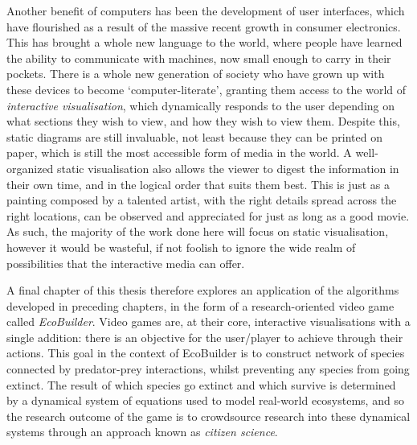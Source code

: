 Another benefit of computers has been the development of user interfaces, which have flourished as a result of the massive recent growth in consumer electronics. This has brought a whole new language to the world, where people have learned the ability to communicate with machines, now small enough to carry in their pockets. There is a whole new generation of society who have grown up with these devices to become `computer-literate', granting them access to the world of \emph{interactive visualisation}, which dynamically responds to the user depending on what sections they wish to view, and how they wish to view them.
Despite this, static diagrams are still invaluable, not least because they can be printed on paper, which is still the most accessible form of media in the world. A well-organized static visualisation also allows the viewer to digest the information in their own time, and in the logical order that suits them best. This is just as a painting composed by a talented artist, with the right details spread across the right locations, can be observed and appreciated for just as long as a good movie.
As such, the majority of the work done here will focus on static visualisation, however it would be wasteful, if not foolish to ignore the wide realm of possibilities that the interactive media can offer.

A final chapter of this thesis therefore explores an application of the algorithms developed in preceding chapters, in the form of a research-oriented video game called \emph{EcoBuilder}. Video games are, at their core, interactive visualisations with a single addition: there is an objective for the user/player to achieve through their actions. This goal in the context of EcoBuilder is to construct network of species connected by predator-prey interactions, whilst preventing any species from going extinct. The result of which species go extinct and which survive is determined by a dynamical system of equations used to model real-world ecosystems, and so the research outcome of the game is to crowdsource research into these dynamical systems through an approach known as \emph{citizen science}.

